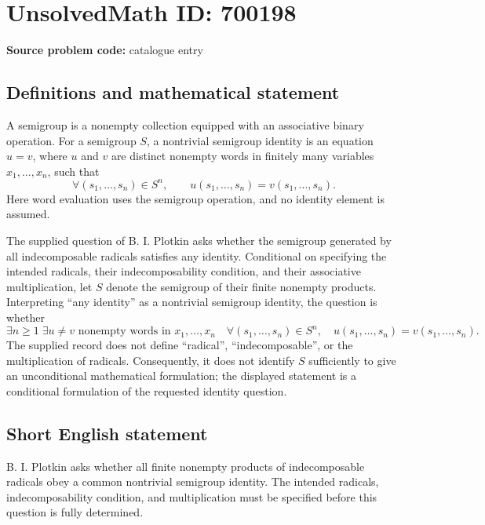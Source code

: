 \documentclass[11pt]{article}
\begin{document}
\section*{UnsolvedMath ID: 700198}
\textbf{Source problem code:} catalogue entry
\subsection{Definitions and mathematical statement}
A semigroup is a nonempty collection equipped with an associative binary operation. For a semigroup \(S\), a nontrivial semigroup identity is an equation \(u=v\), where \(u\) and \(v\) are distinct nonempty words in finitely many variables \(x_1,\ldots,x_n\), such that
\[
\forall (s_1,\ldots,s_n)\in S^n,\qquad u(s_1,\ldots,s_n)=v(s_1,\ldots,s_n).
\]
Here word evaluation uses the semigroup operation, and no identity element is assumed.

The supplied question of B. I. Plotkin asks whether the semigroup generated by all indecomposable radicals satisfies any identity. Conditional on specifying the intended radicals, their indecomposability condition, and their associative multiplication, let \(S\) denote the semigroup of their finite nonempty products. Interpreting ``any identity'' as a nontrivial semigroup identity, the question is whether
\[
\exists n\geq 1\;\exists u\neq v\text{ nonempty words in }x_1,\ldots,x_n\quad
\forall (s_1,\ldots,s_n)\in S^n,\quad u(s_1,\ldots,s_n)=v(s_1,\ldots,s_n).
\]
The supplied record does not define ``radical'', ``indecomposable'', or the multiplication of radicals. Consequently, it does not identify \(S\) sufficiently to give an unconditional mathematical formulation; the displayed statement is a conditional formulation of the requested identity question.
\subsection{Short English statement}
B. I. Plotkin asks whether all finite nonempty products of indecomposable radicals obey a common nontrivial semigroup identity. The intended radicals, indecomposability condition, and multiplication must be specified before this question is fully determined.
\end{document}
